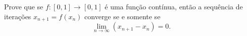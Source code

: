 Prove que se \(f\colon [0,1]\to[0,1]\) é uma função contínua, então a sequência de iterações \(x_{n+1}=f(x_{n})\) converge se e somente se
\[\lim_{n\to \infty}(x_{n+1}-x_{n})=0.\]
